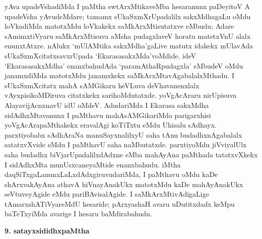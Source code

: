 yAva upadeVshadiMda I paMtha swtArxMtikaveMba hesaranunx paDeyitoV A upadeVsha yAvudeMdare; tamamx sUkaSxmXrUpadalilx sakxMdhagaLu oMdu loVkadiMda matotxMdu loVkakekx saMkArxMtisutatxve eMbudu; Adare sAmimxtiVyaru saMkArxMtisuva aMsha pudagxlaveV horatu matetxVnU alalx enunxtAtxre. nAlukx `mUlAMtika sakxMdha'gaLive matutx idakekx mUlavAda sUkaSxmXcitatxsavxrUpada `EkarasasakxMda'voMdide. ideV `EkarasasakxMdha' enanxbahudAda `paramAthaRpudagxla' eMbudeV oMdu janamxdiMda matotxMdu janamxkekx saMkArxMtavAgabalalxMthadu. I sUkaSxmXcitatx mahA sAMGikaru heVLuva deVhavanenxlalx vAyxpisikoMDiruva citatxkekx sarihoMdutatxde. yoVgAcAraru nirUpisuva AlayavijAcnxnavU idU oMdeV. AdudariMda I Ekarasa sakxMdha sidAdhxMtavanunx I paMthavu mahAsAMGikariMda parigarxhisi yoVgAcArapaMthakekx eravalAgi koTiTxtu eMdu Uhisalu sAdhayx. parxtiyobabx sAdhAraNa manuSayxnalilxyU saha tAnu budadhxnAgabalalx satatxvXvide eMdu I paMthavU saha naMbutatxde. parxtiyoMdu jiVviyalUlx saha budadhx biVjarUpadalilxdAdxne eMba mahAyAna paMthada tatatxvXkekx I sidAdhxMta munUsxcaneyaMtide enanxbahudu. iMtha daqSiTxgaLanunxLaLxdAdxgiruvudariMda, I paMthavu oMdu kaDe shArxvakAyAna athavA hiVnayAnakUkx matotxMdu kaDe mahAyAnakUkx seVtuveyAgide eMdu pariBAvisalAgide. I saMkArxMtivAdigaLige tAmarxshATiVyareMdU hesaride; pArxyashaH avaru uDutitxdadx keMpu baTeTxyiMda avarige I hesaru baMdirabahudu.

\smallskip
\begin{center}
{\textbf{\Large 9. satayxsididhxpaMtha}}
\end{center}

